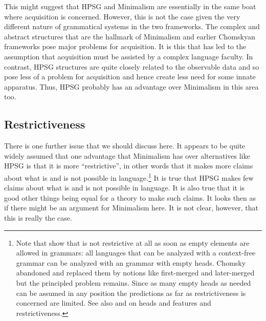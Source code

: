 \documentclass[output=paper]{langsci/langscibook}
\begin{document}
This might suggest that HPSG and Minimalism are essentially in the same boat where acquisition is
concerned. However, this is not the case given the very different nature of grammatical systems in
the two frameworks. The complex and abstract structures that are the hallmark of Minimalism and
earlier Chomskyan frameworks pose major problems for acquisition. It is this that has led to the
assumption that acquisition must be assisted by a complex language faculty.
In contrast, HPSG
structures are quite closely related to the observable data and so pose less of a problem for
acquisition and hence create less need for some innate apparatus. Thus, HPSG probably has an
advantage over Minimalism in this area too.

\subsection{Restrictiveness}
\label{sec:min-restrictive}

There is one further issue that we should discuss here. It appears to be quite widely assumed that
one advantage that Minimalism has over alternatives like HPSG is that it is more ``restrictive'', in
other words that it makes more claims about what is and is not possible in language.\footnote{%
  Note that \citet[, 47]{KP90a} show that \xbart is not restrictive at all as soon as empty
  elements are allowed in grammars: all languages that can be analyzed with a
  context-free grammar can be analyzed with an \xbar grammar with empty heads. Chomsky abandoned \xbart and replaced them by
  notions like first-merged and later-merged but the principled problem remains. Since as many empty
  heads as needed can be assumed in any position the predictions as far as restrictiveness is
  concerned are limited. See also  and  on heads and features and restrictiveness.%
} It is true that
HPSG makes few claims about what is and is not possible in language. It is also true that it is good
other things being equal for a theory to make such claims. 
It looks then as if there might be an
argument for Minimalism here. It is not clear, however, that this is really the case.
\end{document}
